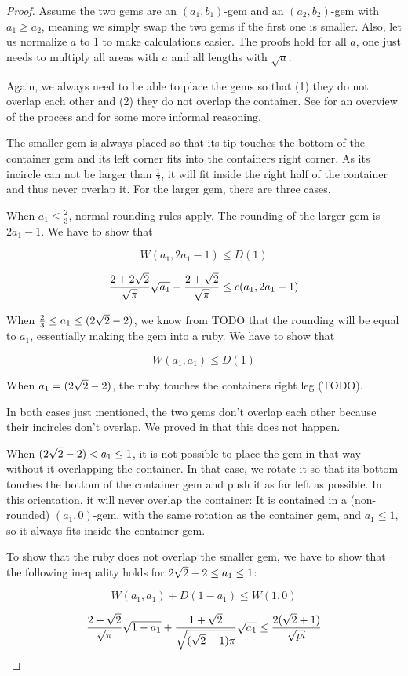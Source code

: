 \documentclass[a4paper,style=print,bibliography=totoc,nexus,lnum,extramargin]{tubsbook}
\begin{document}
\begin{proof}
    Assume \wlofg the two gems are an $(a_1, b_1)$-gem and an $(a_2, b_2)$-gem with $a_1 \ge a_2$, meaning we simply swap the two gems if the first one is smaller. Also, let us normalize $a$ to 1 to make calculations easier. The proofs hold for all $a$, one just needs to multiply all areas with $a$ and all lengths with $\sqrt{a}$.

    Again, we always need to be able to place the gems so that (1) they do not overlap each other and (2) they do not overlap the container. See  for an overview of the process and for some more informal reasoning.

    The smaller gem is always placed so that its tip touches the bottom of the container gem and its left corner fits into the containers right corner. As its incircle can not be larger than $\frac{1}{2}$, it will fit inside the right half of the container and thus never overlap it. For the larger gem, there are three cases.

    When $a_1 \le \frac{2}{3}$, normal rounding rules apply. The rounding of the larger gem is $2a_1 - 1$. We have to show that

    $$W(a_1, 2a_1-1) \le D(1)$$

    $$\frac{2+2\sqrt{2}}{\sqrt{\pi}}\sqrt{a_1}-\frac{2+\sqrt{2}}{\sqrt{\pi}} \le c(a_1, 2a_1-1)$$

    When $\frac{2}{3} \le a_1 \le (2\sqrt{2}-2)$, we know from TODO that the rounding will be equal to $a_1$, essentially making the gem into a ruby. We have to show that

    $$W(a_1, a_1) \le D(1)$$

    When $a_1 = (2\sqrt{2}-2)$, the ruby touches the containers right leg (TODO).

    In both cases just mentioned, the two gems don't overlap each other because their incircles don't overlap. We proved in  that this does not happen.

    When $(2\sqrt{2}-2) < a_1 \le 1$, it is not possible to place the gem in that way without it overlapping the container. In that case, we rotate it so that its bottom touches the bottom of the container gem and push it as far left as possible. In this orientation, it will never overlap the container: It is contained in a (non-rounded) $(a_1, 0)$-gem, with the same rotation as the container gem, and $a_1 \le 1$, so it always fits inside the container gem.

    To show that the ruby does not overlap the smaller gem, we have to show that the following inequality holds for $2\sqrt{2}-2 \le a_1 \le 1$:

    $$W(a_1,a_1) + D(1-a_1) \le W(1,0)$$

    $$\frac{2+\sqrt{2}}{\sqrt{\pi}}\sqrt{1-a_1} + \frac{1+\sqrt{2}}{\sqrt{(\sqrt{2}-1) \pi}}\sqrt{a_1} \le \frac{2(\sqrt{2} + 1)}{\sqrt{pi}}$$

\end{proof}
\end{document}
